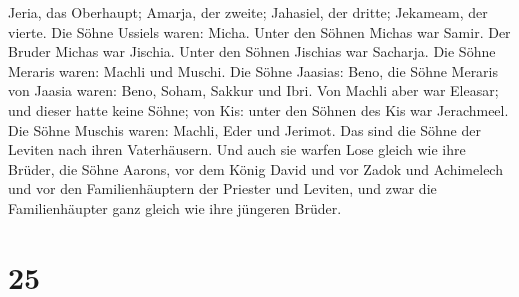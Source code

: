 Jeria, das Oberhaupt; Amarja, der zweite; Jahasiel, der dritte;
Jekameam, der vierte.  Die Söhne Ussiels waren: Micha.
Unter den Söhnen Michas war Samir.  Der Bruder Michas war
Jischia. Unter den Söhnen Jischias war Sacharja.  Die
Söhne Meraris waren: Machli und Muschi.  Die Söhne
Jaasias: Beno, die Söhne Meraris von Jaasia waren: Beno, Soham, Sakkur
und Ibri.  Von Machli aber war Eleasar; und dieser hatte
keine Söhne;  von Kis: unter den Söhnen des Kis war
Jerachmeel.  Die Söhne Muschis waren: Machli, Eder und
Jerimot. Das sind die Söhne der Leviten nach ihren Vaterhäusern.
 Und auch sie warfen Lose gleich wie ihre Brüder, die
Söhne Aarons, vor dem König David und vor Zadok und Achimelech und vor
den Familienhäuptern der Priester und Leviten, und zwar die
Familienhäupter ganz gleich wie ihre jüngeren Brüder.

\hypertarget{section-24}{%
\section{25}\label{section-24}}

